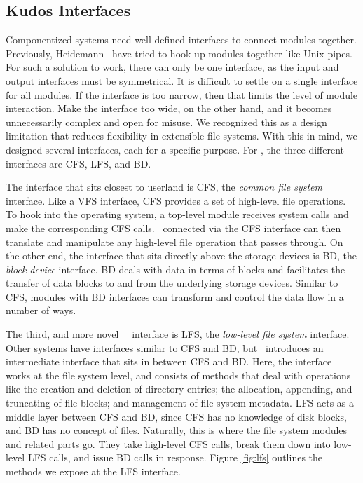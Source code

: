 \subsection{Kudos Interfaces}
\label{sec:interfaces}

Componentized systems need well-defined interfaces to connect modules together.
Previously, Heidemann~\cite{heidemann91layered} have tried to hook up modules
together like Unix pipes. For such a solution to work, there can only be one
interface, as the input and output interfaces must be symmetrical. It is
difficult to settle on a single interface for all modules. If the interface is
too narrow, then that limits the level of module interaction. Make the
interface too wide, on the other hand, and it becomes unnecessarily complex
and open for misuse. We recognized this as a design limitation that reduces
flexibility in extensible file systems. With this in mind, we designed several
interfaces, each for a specific purpose. For \Kudos, the three different
interfaces are CFS, LFS, and BD.

The interface that sits closest to userland is CFS, the
\emph{common file system} interface. Like a VFS interface, CFS provides a set
of high-level file operations. To hook into the operating system, a top-level
module receives system calls and make the corresponding CFS calls.
\Modules\ connected via the CFS interface can then translate and manipulate any
high-level file operation that passes through. On the other end, the interface
that sits directly above the storage devices is BD, the \emph{block device}
interface. BD deals with data in terms of blocks and facilitates the transfer
of data blocks to and from the underlying storage devices. Similar to CFS,
modules with BD interfaces can transform and control the data flow in a number
of ways.

The third, and more novel \Kudos\ \module\ interface is LFS, the
\emph{low-level file system} interface. Other systems have interfaces similar
to CFS and BD, but \Kudos\ introduces an intermediate interface that sits in
between CFS and BD. Here, the interface works at the file system level, and
consists of methods that deal with operations like the creation and deletion
of directory entries; the allocation, appending, and truncating of file blocks;
and management of file system metadata. LFS acts as a middle layer between CFS
and BD, since CFS has no knowledge of disk blocks, and BD has no concept of
files. Naturally, this is where the file system modules and related parts go.
They take high-level CFS calls, break them down into low-level LFS calls, and
issue BD calls in response. Figure \ref{fig:lfs} outlines the methods we
expose at the LFS interface.

